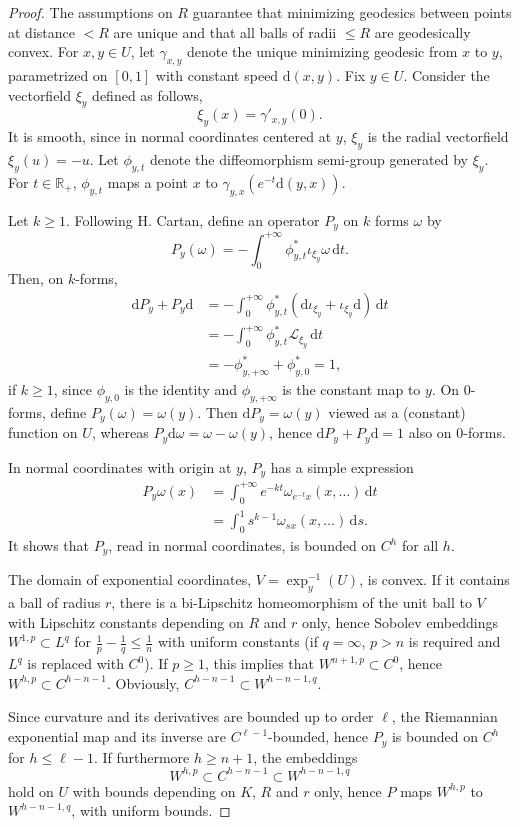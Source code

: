 \documentclass[11pt]{article}
\theoremstyle{definition}
\numberwithin{equation}{section}
\numberwithin{figure}{section}
\numberwithin{table}{section}
\newcommand{\R}{\mathbb{R}}
\newcommand{\dd}{\mathrm{d}}
\newcommand{\dt}{\dd t}
\newcommand{\ds}{\dd s}
\begin{document}
\begin{proof}
The assumptions on $R$ guarantee that minimizing geodesics between points at distance $<R$ are unique and that all balls of radii $\leq R$ are geodesically convex. For $x,y\in U$, let $\gamma_{x,y}$ denote the unique minimizing geodesic from $x$ to $y$, parametrized on $[0,1]$ with constant speed $\dd(x,y)$. Fix $y\in U$. Consider the vectorfield $\xi_y$ defined as follows,
\[
\xi_{y}(x)=\gamma'_{x,y}(0).
\]
It is smooth, since in normal coordinates centered at $y$, $\xi_{y}$ is the radial vectorfield $\xi_y(u)=-u$. Let $\phi_{y,t}$ denote the diffeomorphism semi-group generated by $\xi_y$. For $t\in\R_+$, $\phi_{y,t}$ maps a point $x$ to $\gamma_{y,x}(e^{-t}\dd(y,x))$.

Let $k\geq 1$. Following H. Cartan, define an operator $P_y$ on $k$ forms $\omega$ by
\[
P_y(\omega)=-\int_{0}^{+\infty}\phi_{y,t}^{*}\iota_{\xi_{y}}\omega\,\dt.
\]
Then, on $k$-forms,
\begin{align*}
\dd P_y+P_y\dd &=- \int_{0}^{+\infty}\phi_{y,t}^{*} (\dd\iota_{\xi_{y}} +
\iota_{\xi_{y}}\dd)\,\dt\\
&=-\int_{0}^{+\infty}\phi_{y,t}^{*}\mathcal{L}_{\xi_{y}}\,\dt\\
&=-\phi_{y,+\infty}^{*}+\phi_{y,0}^{*}=1,
\end{align*}
if $k\geq 1$, since $\phi_{y,0}$ is the identity and $\phi_{y,+\infty}$ is the constant map to $y$. On $0$-forms, define $P_y(\omega)=\omega(y)$. Then $\dd P_y=\omega(y)$ viewed as a (constant) function on $U$, whereas $P_y \dd\omega=\omega-\omega(y)$, hence $\dd P_y+P_y \dd=1$ also on $0$-forms.

In normal coordinates with origin at $y$, $P_y$ has a simple expression
\begin{align*}
P_y\omega(x)&=\int_{0}^{+\infty}e^{-kt}\omega_{e^{-t}x}(x,\dots)\,\dt\\
&=\int_{0}^{1}s^{k-1}\omega_{sx}(x,\dots)\,\ds.
\end{align*}
It shows that $P_y$, read in normal coordinates, is bounded on $C^h$ for all $h$.

The domain of exponential coordinates, $V=\exp_y^{-1}(U)$, is convex. If it contains a ball of radius $r$, there is a bi-Lipschitz homeomorphism of the unit ball to $V$ with Lipschitz constants depending on $R$ and $r$ only, hence Sobolev embeddings $W^{1,p}\subset L^q$ for $\frac{1}{p}-\frac{1}{q}\leq\frac{1}{n}$ with uniform constants (if $q=\infty$, $p>n$ is required and $L^q$ is replaced with $C^0$). If $p\geq 1$, this implies that $W^{n+1,p}\subset C^0$, hence $W^{h,p}\subset C^{h-n-1}$. Obviously, $C^{h-n-1}\subset W^{h-n-1,q}$.

Since curvature and its derivatives are bounded up to order $\ell$, the Riemannian exponential map and its inverse are $C^{\ell-1}$-bounded, hence $P_y$ is bounded on $C^h$ for $h \leq \ell-1$. If furthermore $h \geq n+1$, the embeddings
\[
W^{h,p}\subset C^{h-n-1}\subset W^{h-n-1,q}
\]
hold on $U$ with bounds depending on $K$, $R$ and $r$ only, hence $P$ maps $W^{h,p}$ to $W^{h-n-1,q}$, with uniform bounds.
\end{proof}
\end{document}
